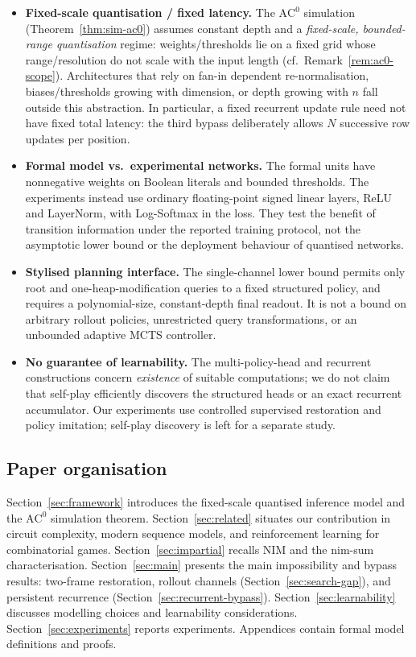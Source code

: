\documentclass[twoside,11pt]{article}
\newcommand{\AC}{\mathrm{AC}}
\numberwithin{theorem}{section}
\numberwithin{equation}{section}
\begin{document}
\begin{itemize}[leftmargin=*]
\item \textbf{Fixed-scale quantisation / fixed latency.}
The $\AC^0$ simulation (Theorem~\ref{thm:sim-ac0}) assumes constant depth and a \emph{fixed-scale, bounded-range quantisation} regime: weights/thresholds lie on a fixed grid whose range/resolution do not scale with the input length (cf.\ Remark~\ref{rem:ac0-scope}).
Architectures that rely on fan-in dependent re-normalisation, biases/thresholds growing with dimension, or depth growing with $n$ fall outside this abstraction.
In particular, a fixed recurrent update rule need not have fixed total latency: the third bypass deliberately allows $N$ successive row updates per position.

\item \textbf{Formal model vs.\ experimental networks.}
The formal units have nonnegative weights on Boolean literals and bounded thresholds. The experiments instead use ordinary floating-point signed linear layers, ReLU and LayerNorm, with Log-Softmax in the loss. They test the benefit of transition information under the reported training protocol, not the asymptotic lower bound or the deployment behaviour of quantised networks.

\item \textbf{Stylised planning interface.}
The single-channel lower bound permits only root and one-heap-modification queries to a fixed structured policy, and requires a polynomial-size, constant-depth final readout. It is not a bound on arbitrary rollout policies, unrestricted query transformations, or an unbounded adaptive MCTS controller.

\item \textbf{No guarantee of learnability.}
The multi-policy-head and recurrent constructions concern \emph{existence} of suitable computations; we do not claim that self-play efficiently discovers the structured heads or an exact recurrent accumulator.
Our experiments use controlled supervised restoration and policy imitation; self-play discovery is left for a separate study.
\end{itemize}

\subsection{Paper organisation}
Section~\ref{sec:framework} introduces the fixed-scale quantised inference model and the $\AC^0$ simulation theorem.
Section~\ref{sec:related} situates our contribution in circuit complexity, modern sequence models, and reinforcement learning for combinatorial games.
Section~\ref{sec:impartial} recalls NIM and the nim-sum characterisation.
Section~\ref{sec:main} presents the main impossibility and bypass results: two-frame restoration, rollout channels (Section~\ref{sec:search-gap}), and persistent recurrence (Section~\ref{sec:recurrent-bypass}).
Section~\ref{sec:learnability} discusses modelling choices and learnability considerations.
Section~\ref{sec:experiments} reports experiments.
Appendices contain formal model definitions and proofs.
\end{document}
